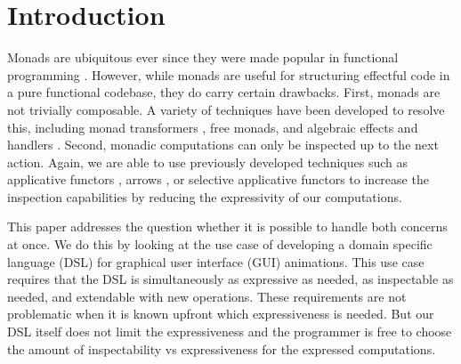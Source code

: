 \section{Introduction}
\label{sec:intro}

Monads are ubiquitous ever since they were made popular in functional programming \cite{DBLP:conf/lfp/Wadler90}. However, while monads are useful for structuring effectful code in a pure functional codebase, they do carry certain drawbacks. First, monads are not trivially composable. A variety of techniques have been developed to resolve this, including monad transformers \cite{DBLP:conf/popl/LiangHJ95}, free monads, and algebraic effects and handlers \cite{DBLP:conf/esop/PlotkinP09}. Second, monadic computations can only be inspected up to the next action. Again, we are able to use previously developed techniques such as applicative functors \cite{DBLP:journals/jfp/McbrideP08}, arrows \cite{DBLP:journals/scp/Hughes00}, or selective applicative functors to increase the inspection capabilities by reducing the expressivity of our computations.

This paper addresses the question whether it is possible to handle both concerns at once. We do this by looking at the use case of developing a domain specific language (DSL) for graphical user interface (GUI) animations. This use case requires that the DSL is simultaneously as expressive as needed, as inspectable as needed, and extendable with new operations. These requirements are not problematic when it is known upfront which expressiveness is needed. But our DSL itself does not limit the expressiveness and the programmer is free to choose the amount of inspectability vs expressiveness for the expressed computations.
